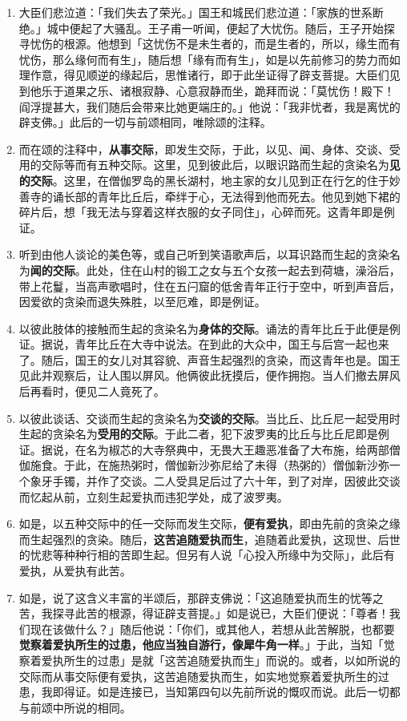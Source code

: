 \begin{enumerate}
\item 大臣们悲泣道：「我们失去了荣光。」国王和城民们悲泣道：「家族的世系断绝。」城中便起了大骚乱。王子甫一听闻，便起了大忧伤。随后，王子开始探寻忧伤的根源。他想到「这忧伤不是未生者的，而是生者的，所以，缘生而有忧伤，那么缘何而有生」，随后想「缘有而有生」，如是以先前修习的势力而如理作意，得见顺逆的缘起后，思惟诸行，即于此坐证得了辟支菩提。大臣们见到他乐于道果之乐、诸根寂静、心意寂静而坐，跪拜而说：「莫忧伤！殿下！阎浮提甚大，我们随后会带来比她更端庄的。」他说：「我非忧者，我是离忧的辟支佛。」此后的一切与前颂相同，唯除颂的注释。
\item 而在颂的注释中，\textbf{从事交际}，即发生交际，于此，以见、闻、身体、交谈、受用的交际等而有五种交际。这里，见到彼此后，以眼识路而生起的贪染名为\textbf{见的交际}。这里，在僧伽罗岛的黑长湖村，地主家的女儿见到正在行乞的住于妙善寺的诵长部的青年比丘后，牵绊于心，无法得到他而死去。他见到她下裙的碎片后，想「我无法与穿着这样衣服的女子同住」，心碎而死。这青年即是例证。
\item 听到由他人谈论的美色等，或自己听到笑语歌声后，以耳识路而生起的贪染名为\textbf{闻的交际}。此处，住在山村的锻工之女与五个女孩一起去到荷塘，澡浴后，带上花鬘，当高声歌唱时，住在五闩窟的低舍青年正行于空中，听到声音后，因爱欲的贪染而退失殊胜，以至厄难，即是例证。
\item 以彼此肢体的接触而生起的贪染名为\textbf{身体的交际}。诵法的青年比丘于此便是例证。据说，青年比丘在大寺中说法。在到此的大众中，国王与后宫一起也来了。随后，国王的女儿对其容貌、声音生起强烈的贪染，而这青年也是。国王见此并观察后，让人围以屏风。他俩彼此抚摸后，便作拥抱。当人们撤去屏风后再看时，便见二人竟死了。
\item 以彼此谈话、交谈而生起的贪染名为\textbf{交谈的交际}。当比丘、比丘尼一起受用时生起的贪染名为\textbf{受用的交际}。于此二者，犯下波罗夷的比丘与比丘尼即是例证。据说，在名为椒芯的大寺祭典中，无畏大王趣恶准备了大布施，给两部僧伽施食。于此，在施热粥时，僧伽新沙弥尼给了未得（热粥的）僧伽新沙弥一个象牙手镯，并作了交谈。二人受具足后过了六十年，到了对岸，因彼此交谈而忆起从前，立刻生起爱执而违犯学处，成了波罗夷。
\item 如是，以五种交际中的任一交际而发生交际，\textbf{便有爱执}，即由先前的贪染之缘而生起强烈的贪染。随后，\textbf{这苦追随爱执而生}，追随着此爱执，这现世、后世的忧悲等种种行相的苦即生起。但另有人说「心投入所缘中为交际」，此后有爱执，从爱执有此苦。
\item 如是，说了这含义丰富的半颂后，那辟支佛说：「这追随爱执而生的忧等之苦，我探寻此苦的根源，得证辟支菩提。」如是说已，大臣们便说：「尊者！我们现在该做什么？」随后他说：「你们，或其他人，若想从此苦解脱，也都要\textbf{觉察着爱执所生的过患，他应当独自游行，像犀牛角一样}。」于此，当知「觉察着爱执所生的过患」是就「这苦追随爱执而生」而说的。或者，以如所说的交际而从事交际便有爱执，这苦追随爱执而生，如实地觉察着爱执所生的过患，我即得证。如是连接已，当知第四句以先前所说的慨叹而说。此后一切都与前颂中所说的相同。\end{enumerate}

